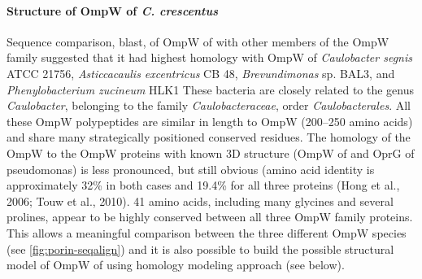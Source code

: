 \paragraph{Structure of OmpW of \textit{C. crescentus}}\label{sub:structompw}
Sequence comparison, \ac{blast}, of OmpW of \caulobacter with other members of the OmpW family suggested that it had highest homology with OmpW of \textit{Caulobacter segnis} ATCC 21756, \textit{Asticcacaulis excentricus} CB 48, \textit{Brevundimonas} sp. BAL3, and \textit{Phenylobacterium zucineum} HLK1 These bacteria are closely related to the genus \textit{Caulobacter}, belonging to the family \textit{Caulobacteraceae}, order \textit{Caulobacterales}. All these OmpW polypeptides are similar in length to \caulobacter OmpW (200--250 amino acids) and share many strategically positioned conserved residues. The homology of the \caulobacter OmpW to the OmpW proteins with known 3D structure (OmpW of \ecoli and OprG of \ac{pseudomonas}) is less pronounced, but still obvious (amino acid identity is approximately 32\% in both cases and 19.4\% for all three proteins  (Hong et al., 2006; Touw et al., 2010). 41 amino acids, including many glycines and several prolines, appear to be highly conserved between all three OmpW family proteins. This allows a meaningful comparison between the three different OmpW species (see \cref{fig:porin-seqalign}) and it is also possible to build the possible structural model of OmpW of \caulobacter using homology modeling approach (see below). 

